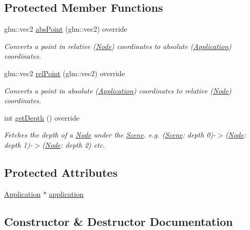 \subsection*{Protected Member Functions}
\begin{DoxyCompactItemize}
\item 
glm\+::vec2 \mbox{\hyperlink{classsage_1_1Scene_a97d7d623cc44062249a199c63c67b5be}{abs\+Point}} (glm\+::vec2) override
\begin{DoxyCompactList}\small\item\em Converts a point in relative (\mbox{\hyperlink{classsage_1_1Node}{Node}}) coordinates to absolute (\mbox{\hyperlink{classsage_1_1Application}{Application}}) coordinates. \end{DoxyCompactList}\item 
glm\+::vec2 \mbox{\hyperlink{classsage_1_1Scene_aa8b5a43db8e18dc3ec8695ca465a1308}{rel\+Point}} (glm\+::vec2) override
\begin{DoxyCompactList}\small\item\em Converts a point in absolute (\mbox{\hyperlink{classsage_1_1Application}{Application}}) coordinates to relative (\mbox{\hyperlink{classsage_1_1Node}{Node}}) coordinates. \end{DoxyCompactList}\item 
int \mbox{\hyperlink{classsage_1_1Scene_a46335ecefda27ab0b907397a393a12f9}{get\+Depth}} () override
\begin{DoxyCompactList}\small\item\em Fetches the depth of a \mbox{\hyperlink{classsage_1_1Node}{Node}} under the \mbox{\hyperlink{classsage_1_1Scene}{Scene}}. e.\+g. (\mbox{\hyperlink{classsage_1_1Scene}{Scene}}\+: depth 0)-\/$>$(\mbox{\hyperlink{classsage_1_1Node}{Node}}\+: depth 1)-\/$>$(\mbox{\hyperlink{classsage_1_1Node}{Node}}\+: depth 2) etc. \end{DoxyCompactList}\end{DoxyCompactItemize}
\subsection*{Protected Attributes}
\begin{DoxyCompactItemize}
\item 
\mbox{\hyperlink{classsage_1_1Application}{Application}} $\ast$ \mbox{\hyperlink{classsage_1_1Scene_a06046ccc778f9e7257e777c048c481b9}{application}}
\end{DoxyCompactItemize}


\subsection{Constructor \& Destructor Documentation}
\mbox{\label{classsage_1_1Scene_ad10176d75a9cc0da56626f682d083507}} 

